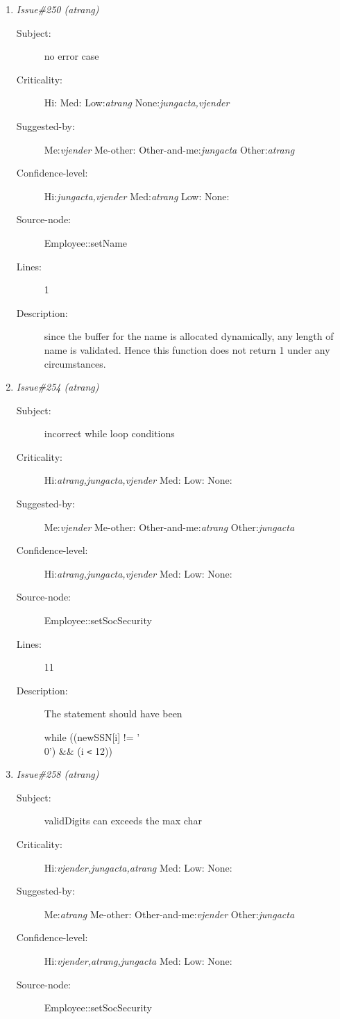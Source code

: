 \begin{enumerate}
\begin{description}
\item [Lines:] 6-9

\item [Description:] if name is not 0, old memory should be destroy first and reallocate to the
correct size to hold the new name.
\end{description}
\item {\it Issue\#250 (atrang)}
\begin{description}
\item [Subject:] no error case
\item [Criticality:] Hi:{\it } Med:{\it } Low:{\it atrang} None:{\it jungacta,vjender}
\item [Suggested-by:] Me:{\it vjender} Me-other:{\it } Other-and-me:{\it jungacta} Other:{\it atrang}
\item [Confidence-level:] Hi:{\it jungacta,vjender} Med:{\it atrang} Low:{\it } None:{\it }
\item [Source-node:] Employee::setName

\item [Lines:] 1

\item [Description:] since the buffer for the name is allocated dynamically, any length of name is
validated.  Hence this function does not return 1 under any circumstances.
\end{description}
\item {\it Issue\#254 (atrang)}
\begin{description}
\item [Subject:] incorrect while loop conditions
\item [Criticality:] Hi:{\it atrang,jungacta,vjender} Med:{\it } Low:{\it } None:{\it }
\item [Suggested-by:] Me:{\it vjender} Me-other:{\it } Other-and-me:{\it atrang} Other:{\it jungacta}
\item [Confidence-level:] Hi:{\it atrang,jungacta,vjender} Med:{\it } Low:{\it } None:{\it }
\item [Source-node:] Employee::setSocSecurity

\item [Lines:] 11

\item [Description:] The statement should have been

while ((newSSN[i] != '\\0') \&\& (i {\tt <} 12))
\end{description}
\item {\it Issue\#258 (atrang)}
\begin{description}
\item [Subject:] validDigits can exceeds the max char
\item [Criticality:] Hi:{\it vjender,jungacta,atrang} Med:{\it } Low:{\it } None:{\it }
\item [Suggested-by:] Me:{\it atrang} Me-other:{\it } Other-and-me:{\it vjender} Other:{\it jungacta}
\item [Confidence-level:] Hi:{\it vjender,atrang,jungacta} Med:{\it } Low:{\it } None:{\it }
\item [Source-node:] Employee::setSocSecurity


\end{description}
\end{enumerate}
